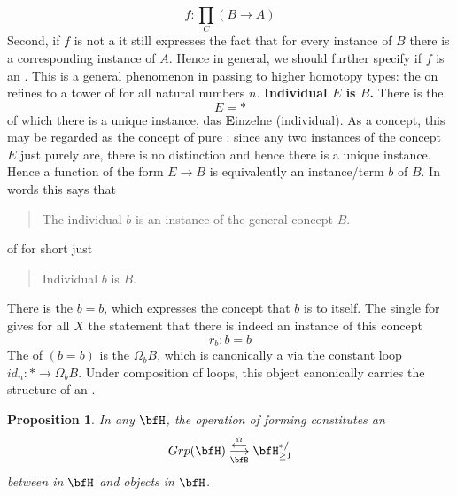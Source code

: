 \documentclass[12pt,titlepage]{article}
\theoremstyle{plain}
\newtheorem{prop}{Proposition}
\theoremstyle{definition}
\theoremstyle{remark}
\begin{document}
\begin{displaymath}
f\colon \underset{C}{\prod} (B \longrightarrow A)
\end{displaymath}
Second, if $f$ is not a  it still expresses the fact that for every instance of $B$ there is a corresponding instance of $A$. Hence in general, we should further specify if $f$ is an . This is a general phenomenon in passing to higher homotopy types: the  on  refines to a tower of  for all natural numbers $n$.
\textbf{Individual $E$ is $B$.}
There is the 
\begin{displaymath}
E = \ast
\end{displaymath}
of which there is a unique instance, das \textbf{E}inzelne (individual). As a concept, this may be regarded as the concept of pure : since any two instances of the concept $E$ just purely are, there is no distinction and hence there is a unique instance.
Hence a function of the form $E \longrightarrow B$ is equivalently an instance/term $b$ of $B$. In words this says that
\begin{quote}%
The individual $b$ is an instance of the general concept $B$.
\end{quote}
of for short just
\begin{quote}%
Individual $b$ is $B$.
\end{quote}
There is the  $b = b$, which expresses the concept that $b$ is  to itself.
The single  for  gives for all $X$ the statement that there is indeed an instance of this concept
\begin{displaymath}
r_b \colon b = b
\end{displaymath}
The  of $(b = b)$ is the  $\Omega_b B$, which is canonically a  via the constant loop $id_n \colon \ast \to \Omega_b B$.
Under composition of loops, this object canonically carries the structure of an .
\begin{prop}
\label{LoopingDeloopingTheorem}\hypertarget{LoopingDeloopingTheorem}{}
In any  $\bfH$, the operation of forming  constitutes an 
\begin{displaymath}
Grp(\bfH)
\stackrel{\overset{\Omega}{\longleftarrow}}{\underset{\bfB}{\longrightarrow}}
\bfH^{\ast/}_{\geq 1}
\end{displaymath}
between  in $\bfH$ and   objects in $\bfH$.
\end{prop}
\end{document}
